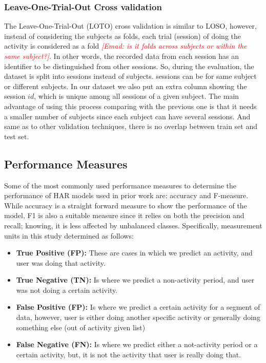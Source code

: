 \documentclass[journal,article,submit,moreauthors,pdftex]{Definitions/mdpi}
\newcommand{\emad}[1]{\textcolor{red}{{\it [Emad: #1]}}}
\begin{document}
\subsubsection{Leave-One-Trial-Out Cross validation}
The Leave-One-Trial-Out (LOTO) cross validation is similar to LOSO, however, instead of considering the subjects as folds, each trial (session) of doing the activity is considered as a fold \emad{is it folds across subjects or within the same subject?}. In other words, the recorded data from each session has an identifier to be distinguished from other sessions. So, during the evaluation, the dataset is split into sessions instead of subjects. sessions can be for same subject or different subjects. In our dataset we also put an extra column showing the session $id$, which is unique among all sessions of a given subject. The main advantage of using this process comparing with the previous one is that it needs a smaller number of subjects since each subject can have several sessions. And same as to other validation techniques, there is no overlap between train set and test set.


\subsection{Performance Measures}

Some of the most commonly used performance measures to determine the performance of HAR models used in prior work are: accuracy\cite{brownlee2018gentle,zhang2011feature,mehrang2017human} and F-measure\cite{rosati2018comparison,Nourani_CoMoRea2019}. While accuracy is a straight forward measure to show the performance of the model, F1 is also a suitable measure since it relies on both the precision and recall; knowing, it is less affected by unbalanced classes. Specifically, measurement units in this study determined as follows:

\begin{itemize}

\item \textbf{True Positive (FP):} These are cases in which we predict an activity, and user was doing that activity.\\

\item \textbf{True Negative (TN):} Is where we predict a non-activity period, and user was not doing a certain activity.\\

\item \textbf{False Positive (FP):} Is where we predict a certain activity for a segment of data, however, user is either doing another specific activity or generally doing something else (out of activity given list)\\

\item \textbf{False Negative (FN):} Is where we predict either a not-activity period or a certain activity, but, it is not the activity that user is really doing that.\\

\end{itemize}
\end{document}

